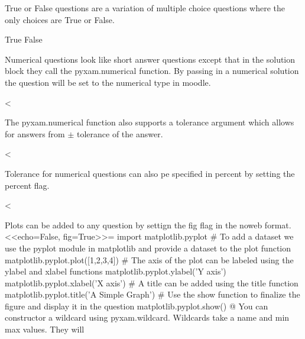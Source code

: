 \documentclass[12pt]{exam}
\begin{document}
\begin{questions}
                True or False questions are a variation of multiple choice questions where the only choices are True or
                False.
                \begin{choices}
                    \choice True
                    \CorrectChoice False
                \end{choices}
                Numerical questions look like short answer questions except that in the solution block they call the
                pyxam.numerical function. By passing in a numerical solution the question will be set to the numerical
                type in moodle.
                \begin{solution}
                    <%
                \end{solution}
                The pyxam.numerical function also supports a tolerance argument which allows for answers from $\pm$
                tolerance of the answer.
                \begin{solution}
                    <%
                \end{solution}
                Tolerance for numerical questions can also pe specified in percent by setting the percent flag.
                \begin{solution}
                    <%
                \end{solution}
                Plots can be added to any question by settign the fig flag in the noweb format.
<<echo=False, fig=True>>=
import matplotlib.pyplot
# To add a dataset we use the pyplot module in matplotlib and provide a dataset to the plot function
matplotlib.pyplot.plot([1,2,3,4])
# The axis of the plot can be labeled using the ylabel and xlabel functions
matplotlib.pyplot.ylabel('Y axis')
matplotlib.pyplot.xlabel('X axis')
# A title can be added using the title function
matplotlib.pyplot.title('A Simple Graph')
# Use the show function to finalize the figure and display it in the question
matplotlib.pyplot.show()
@
                You can constructor a wildcard using pyxam.wildcard. Wildcards take a name and min max values. They will

\end{questions}
\end{document}
